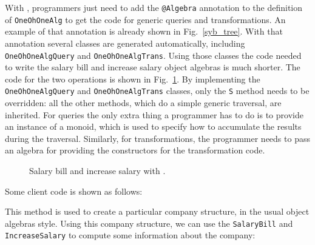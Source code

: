 With \Name, programmers just need to add the \lstinline{@Algebra} annotation
to the definition of \lstinline{OneOhOneAlg} to get the code for generic
queries and transformations. An example of that annotation is already
shown in Fig.~\ref{syb_tree}. With that annotation several classes
are generated automatically, including \lstinline{OneOhOneAlgQuery} and
\lstinline{OneOhOneAlgTrans}. Using those classes the code needed to write
the salary bill and increase salary object algebras is much
shorter. The code for the two operations is shown in
Fig.~\ref{query_with_oaframework}. By implementing the
\lstinline{OneOhOneAlgQuery} and \lstinline{OneOhOneAlgTrans} classes, only the
\lstinline{S} method needs to be overridden: all the other methods,
which do a simple generic traversal, are inherited. For queries the
only extra thing a programmer has to do is to provide an instance of a
monoid, which is used to specify how to accumulate the results during
the traversal. Similarly, for transformations, the programmer needs to
pass an algebra for providing the constructors for the transformation
code.

\begin{figure}[tb]
\nocaptionrule
\caption{Salary bill and increase salary with \Name.}
\label{query_with_oaframework}
\end{figure}

Some client code is shown as follows: %


This method is used to create a particular company structure, in the
usual object algebras style.
Using this company structure, we can use the \lstinline{SalaryBill}
and \lstinline{IncreaseSalary} to compute some information about the company:

